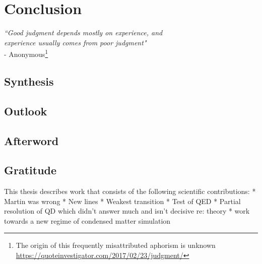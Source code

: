 
\chapter{Conclusion}

\begin{flushright}
\emph{``Good judgment depends mostly on experience, and\\ experience usually comes from poor judgment"} \\- Anonymous\footnote{The origin of this frequently misattributed aphorism is unknown \url{https://quoteinvestigator.com/2017/02/23/judgment/}}
\end{flushright}


\section{Synthesis}\label{sec:synthesis}
\section{Outlook}\label{sec:outlook}
\section{Afterword}\label{sec:afterword}
\section*{Gratitude}\label{sec:gratitude}

This thesis describes work that consists of the following scientific
contributions: * Martin was wrong * New lines * Weakest transition *
Test of QED * Partial resolution of QD which didn't answer much and
isn't decisive re: theory * work towards a new regime of condensed
matter simulation

